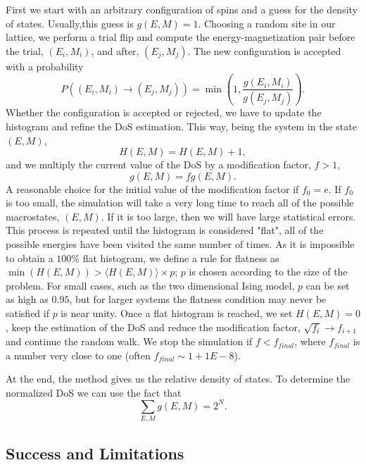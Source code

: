 First we start with an arbitrary configuration of spins and a guess for the density of states. Usually,this  guess is $g(E, M)=1$. Choosing a random site in our lattice, we perform a trial flip and compute the energy-magnetization pair before the trial, $(E_i, M_i)$, and after, $(E_j,M_j)$. The new configuration is accepted with a probability
\begin{equation}
	P((E_i, M_i) \rightarrow (E_j, M_j)) = \min\left(1, \frac{g(E_i, M_i)}{g(E_j, M_j)}\right).
\end{equation}
Whether the configuration is accepted or rejected, we have to update the histogram and refine the DoS estimation. This way, being the system in the state $(E, M)$,
\begin{equation*}
	H(E, M) = H(E,M)+1,
\end{equation*}
and we multiply the current value of the DoS by a modification factor, $f > 1$,
\begin{equation*}
	g(E,M)=fg(E,M).
\end{equation*}
A reasonable choice for the initial value of the modification factor if $f_0 = e$. If $f_0$ is too small, the simulation will take a very long time to reach all of the possible macrostates, $(E,M)$. If it is too large, then we will have large statistical errors.  
This process is repeated until the histogram is considered "flat", all of the possible energies have been visited the same number of times. As it is impossible to obtain a $100\%$ flat histogram, we define a rule for flatness as $\min(H(E, M)) > \langle H(E, M) \rangle \times p$; $p$ is chosen according to the size of the problem. For small cases, such as the two dimensional Ising model, $p$ can be set as high as $0.95$, but for larger systems the flatness condition may never be satisfied if $p$ is near unity.  
Once a flat histogram is reached, we set $H(E, M)=0$, keep the estimation of the DoS and reduce the modification factor, $\sqrt{f_{i}} \rightarrow f_{i+1}$ and continue the random walk. We stop the simulation if $f<f_{final}$, where $f_{final}$ is a number very close to one (often $f_{final} \sim 1+1E-8$). 

At the end, the method gives us the relative density of states. To determine the normalized DoS we can use the fact that 
\begin{equation}
	\sum_{E,M} g(E,M) = 2^N.
\end{equation}

\subsection{Success and Limitations}

